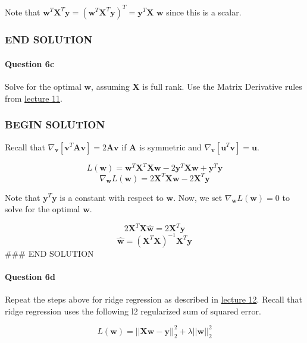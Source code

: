 \documentclass[11pt]{article}
\begin{document}
Note that
\(\textbf{w}^T \textbf{X}^T \textbf{y} = (\textbf{w}^T \textbf{X}^T \textbf{y})^T = \textbf{y}^T \textbf{X w}\)
since this is a scalar.

\subsubsection{END SOLUTION}\label{end-solution}

    \paragraph{Question 6c}\label{question-6c}

Solve for the optimal \(\textbf{w}\), assuming \(\textbf{X}\) is full
rank. Use the Matrix Derivative rules from
\href{http://www.ds100.org/fa18/syllabus\#lecture-week-6}{lecture 11}.

    \subsubsection{BEGIN SOLUTION}\label{begin-solution}

Recall that
\(\nabla_\textbf{v}[\textbf{v}^T\textbf{Av}] = 2\textbf{Av}\) if
\(\textbf{A}\) is symmetric and
\(\nabla_\textbf{v}[\textbf{u}^T\textbf{v}] = \textbf{u}\).

\[L(\textbf{w}) = \textbf{w}^T \textbf{X}^T \textbf{X} \textbf{w} - 2 \textbf{y}^T \textbf{X} \textbf{w} + \textbf{y}^T \textbf{y}\]
\[\nabla_\textbf{w} L(\textbf{w}) = 2\textbf{X}^T\textbf{X}\textbf{w} - 2\textbf{X}^T\textbf{y}\]

Note that \(\textbf{y}^T \textbf{y}\) is a constant with respect to
\(\textbf{w}\). Now, we set \(\nabla_\textbf{w} L(\textbf{w}) = 0\) to
solve for the optimal \(\textbf{w}\).

\[2\textbf{X}^T\textbf{X}\hat{\textbf{w}} = 2\textbf{X}^T\textbf{y}\]
\[\hat{\textbf{w}} = (\textbf{X}^T\textbf{X})^{-1}\textbf{X}^T\textbf{y}\]
\#\#\# END SOLUTION

    \paragraph{Question 6d}\label{question-6d}

Repeat the steps above for ridge regression as described in
\href{http://www.ds100.org/fa18/syllabus\#lecture-week-6}{lecture 12}.
Recall that ridge regression uses the following l2 regularized sum of
squared error.

\[L(\textbf{w}) = ||\textbf{X}\textbf{w} - \textbf{y}||_2^2 + \lambda ||\textbf{w}||_2^2\]
\end{document}
